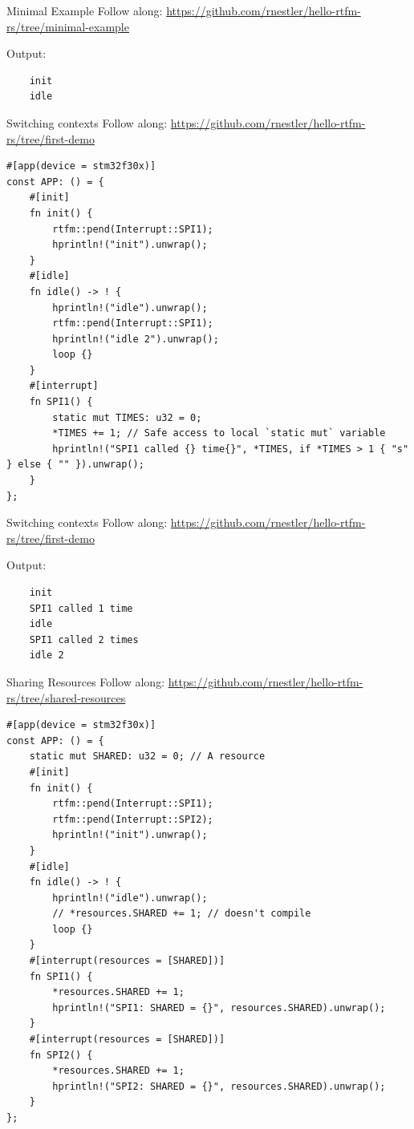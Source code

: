 \documentclass[aspectratio=1610,14pt,t]{beamer}
\begin{document}
\begin{frame}[c,fragile]{Minimal Example}
  \small{Follow along: \url{https://github.com/rnestler/hello-rtfm-rs/tree/minimal-example}}

  Output:
  \begin{verbatim}
    init
    idle
  \end{verbatim}
\end{frame}

\begin{frame}[c,fragile]{Switching contexts}
  \small{Follow along: \url{https://github.com/rnestler/hello-rtfm-rs/tree/first-demo}}
  \begin{verbatim}
#[app(device = stm32f30x)]
const APP: () = {
    #[init]
    fn init() {
        rtfm::pend(Interrupt::SPI1);
        hprintln!("init").unwrap();
    }
    #[idle]
    fn idle() -> ! {
        hprintln!("idle").unwrap();
        rtfm::pend(Interrupt::SPI1);
        hprintln!("idle 2").unwrap();
        loop {}
    }
    #[interrupt]
    fn SPI1() {
        static mut TIMES: u32 = 0;
        *TIMES += 1; // Safe access to local `static mut` variable
        hprintln!("SPI1 called {} time{}", *TIMES, if *TIMES > 1 { "s" } else { "" }).unwrap();
    }
};
  \end{verbatim}
\end{frame}


\begin{frame}[c,fragile]{Switching contexts}
  \small{Follow along: \url{https://github.com/rnestler/hello-rtfm-rs/tree/first-demo}}

  Output:
  \begin{verbatim}
    init
    SPI1 called 1 time
    idle
    SPI1 called 2 times
    idle 2
  \end{verbatim}
\end{frame}

\begin{frame}[c,fragile]{Sharing Resources}
  \tiny{Follow along: \url{https://github.com/rnestler/hello-rtfm-rs/tree/shared-resources}}
  \begin{verbatim}
#[app(device = stm32f30x)]
const APP: () = {
    static mut SHARED: u32 = 0; // A resource
    #[init]
    fn init() {
        rtfm::pend(Interrupt::SPI1);
        rtfm::pend(Interrupt::SPI2);
        hprintln!("init").unwrap();
    }
    #[idle]
    fn idle() -> ! {
        hprintln!("idle").unwrap();
        // *resources.SHARED += 1; // doesn't compile
        loop {}
    }
    #[interrupt(resources = [SHARED])]
    fn SPI1() {
        *resources.SHARED += 1;
        hprintln!("SPI1: SHARED = {}", resources.SHARED).unwrap();
    }
    #[interrupt(resources = [SHARED])]
    fn SPI2() {
        *resources.SHARED += 1;
        hprintln!("SPI2: SHARED = {}", resources.SHARED).unwrap();
    }
};
  \end{verbatim}
\end{frame}
\end{document}
